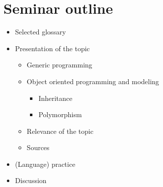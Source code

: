 
\renewcommand{\workingdir}{../../../}



\DNotiz{}
\renewcommand{\Dokumentensignatur}{}
\renewcommand{\Autorformat}[1]{\textcolor{darkgray}{Seminar by}\\\textcolor{darkgray}{#1}}
\date{May 4, 2016} 



\maketitle
\newpage

\section*{Seminar outline}
\begin{itemize}
\item Selected glossary
\item Presentation of the topic
\begin{itemize}
\item Generic programming
\item Object oriented programming and modeling
\begin{itemize}
\item Inheritance
\item Polymorphism
\end{itemize}
\item Relevance of the topic
\item Sources
\end{itemize}
\item (Language) practice
\item Discussion
\end{itemize}
